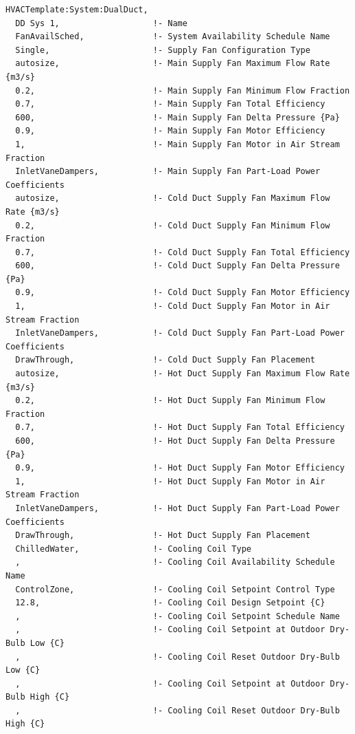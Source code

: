 \begin{lstlisting}
HVACTemplate:System:DualDuct,
  DD Sys 1,                   !- Name
  FanAvailSched,              !- System Availability Schedule Name
  Single,                     !- Supply Fan Configuration Type
  autosize,                   !- Main Supply Fan Maximum Flow Rate {m3/s}
  0.2,                        !- Main Supply Fan Minimum Flow Fraction
  0.7,                        !- Main Supply Fan Total Efficiency
  600,                        !- Main Supply Fan Delta Pressure {Pa}
  0.9,                        !- Main Supply Fan Motor Efficiency
  1,                          !- Main Supply Fan Motor in Air Stream Fraction
  InletVaneDampers,           !- Main Supply Fan Part-Load Power Coefficients
  autosize,                   !- Cold Duct Supply Fan Maximum Flow Rate {m3/s}
  0.2,                        !- Cold Duct Supply Fan Minimum Flow Fraction
  0.7,                        !- Cold Duct Supply Fan Total Efficiency
  600,                        !- Cold Duct Supply Fan Delta Pressure {Pa}
  0.9,                        !- Cold Duct Supply Fan Motor Efficiency
  1,                          !- Cold Duct Supply Fan Motor in Air Stream Fraction
  InletVaneDampers,           !- Cold Duct Supply Fan Part-Load Power Coefficients
  DrawThrough,                !- Cold Duct Supply Fan Placement
  autosize,                   !- Hot Duct Supply Fan Maximum Flow Rate {m3/s}
  0.2,                        !- Hot Duct Supply Fan Minimum Flow Fraction
  0.7,                        !- Hot Duct Supply Fan Total Efficiency
  600,                        !- Hot Duct Supply Fan Delta Pressure {Pa}
  0.9,                        !- Hot Duct Supply Fan Motor Efficiency
  1,                          !- Hot Duct Supply Fan Motor in Air Stream Fraction
  InletVaneDampers,           !- Hot Duct Supply Fan Part-Load Power Coefficients
  DrawThrough,                !- Hot Duct Supply Fan Placement
  ChilledWater,               !- Cooling Coil Type
  ,                           !- Cooling Coil Availability Schedule Name
  ControlZone,                !- Cooling Coil Setpoint Control Type
  12.8,                       !- Cooling Coil Design Setpoint {C}
  ,                           !- Cooling Coil Setpoint Schedule Name
  ,                           !- Cooling Coil Setpoint at Outdoor Dry-Bulb Low {C}
  ,                           !- Cooling Coil Reset Outdoor Dry-Bulb Low {C}
  ,                           !- Cooling Coil Setpoint at Outdoor Dry-Bulb High {C}
  ,                           !- Cooling Coil Reset Outdoor Dry-Bulb High {C}

\end{lstlisting}
